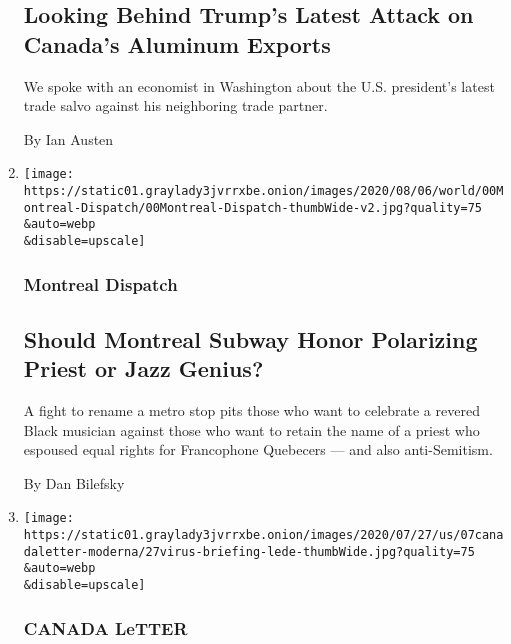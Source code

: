 \begin{enumerate}
  \hypertarget{looking-behind-trumps-latest-attack-on-canadas-aluminum-exports}{%
  \subsection{Looking Behind Trump's Latest Attack on Canada's Aluminum
  Exports}\label{looking-behind-trumps-latest-attack-on-canadas-aluminum-exports}}

  We spoke with an economist in Washington about the U.S. president's
  latest trade salvo against his neighboring trade partner.

  By Ian Austen
\item
  \href{/2020/08/10/world/canada/oscar-peterson-montreal-little-burgundy.html}{}

  \texttt{[image: https://static01.graylady3jvrrxbe.onion/images/2020/08/06/world/00Montreal-Dispatch/00Montreal-Dispatch-thumbWide-v2.jpg?quality=75\\\&auto=webp\\\&disable=upscale]}

  \hypertarget{montreal-dispatch}{%
  \subsubsection{Montreal Dispatch}\label{montreal-dispatch}}

  \hypertarget{should-montreal-subway-honor-polarizing-priest-or-jazz-genius}{%
  \subsection{Should Montreal Subway Honor Polarizing Priest or Jazz
  Genius?}\label{should-montreal-subway-honor-polarizing-priest-or-jazz-genius}}

  A fight to rename a metro stop pits those who want to celebrate a
  revered Black musician against those who want to retain the name of a
  priest who espoused equal rights for Francophone Quebecers --- and
  also anti-Semitism.

  By Dan Bilefsky
\item
  \href{/2020/08/07/world/canada/canada-letter-vaccine.html}{}

  \texttt{[image: https://static01.graylady3jvrrxbe.onion/images/2020/07/27/us/07canadaletter-moderna/27virus-briefing-lede-thumbWide.jpg?quality=75\\\&auto=webp\\\&disable=upscale]}

  \hypertarget{canada-letter-1}{%
  \subsubsection{CANADA LeTTER}\label{canada-letter-1}}


\end{enumerate}
